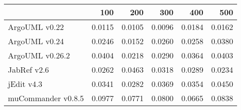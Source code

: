 \begin{tabular}{lrrrrr}
\toprule
{} &    100 &    200 &    300 &    400 &    500 \\
\midrule
ArgoUML v0.22      & 0.0115 & 0.0105 & 0.0096 & 0.0184 & 0.0162 \\
ArgoUML v0.24      & 0.0246 & 0.0152 & 0.0260 & 0.0258 & 0.0380 \\
ArgoUML v0.26.2    & 0.0404 & 0.0218 & 0.0290 & 0.0364 & 0.0403 \\
JabRef v2.6        & 0.0262 & 0.0463 & 0.0318 & 0.0289 & 0.0234 \\
jEdit v4.3         & 0.0341 & 0.0282 & 0.0369 & 0.0354 & 0.0450 \\
muCommander v0.8.5 & 0.0977 & 0.0771 & 0.0800 & 0.0665 & 0.0838 \\
\bottomrule
\end{tabular}
